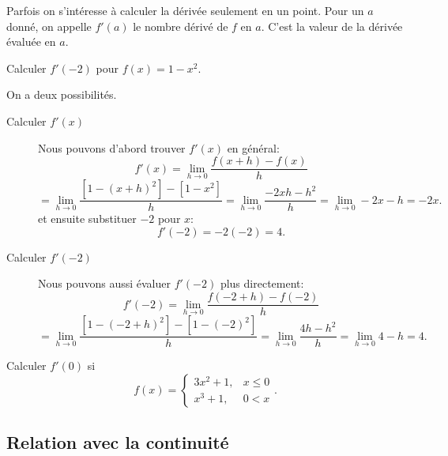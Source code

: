 \documentclass[a4paper,12pt]{article}
\begin{document}
Parfois on s'intéresse à calculer la dérivée seulement en un point. Pour un $a$ donné, on appelle $f'(a)$ le nombre dérivé de $f$ en $a$. C'est la valeur de la dérivée évaluée en $a$. 
\begin{exemple}
\tcblower 
Calculer $f'(-2)$ pour $f(x)=1-x^2$. 

On a deux possibilités. 
\begin{description}
	\item[Calculer $f'(x)$]
 Nous pouvons d'abord trouver $f'(x)$ en général:
$$f'(x) = \displaystyle\lim_{h \to 0} \dfrac{f(x+h) - f(x)}{h}$$
$$= \displaystyle\lim_{h \to 0} \dfrac{[1 - (x+h)^2] - [1 - x^2]}{h} = \displaystyle\lim_{h \to 0} \dfrac{-2xh - h^2}{h} = \displaystyle\lim_{h \to 0} -2x - h = -2x.$$
et ensuite substituer $-2$ pour $x$:
$$f'(-2) = -2(-2) = 4.$$

	\item[Calculer $f'(-2)$] 
Nous pouvons aussi évaluer $f'(-2)$ plus directement:
$$f'(-2) = \displaystyle\lim_{h \to 0} \dfrac{f(-2+h) - f(-2)}{h}$$
$$= \displaystyle\lim_{h \to 0} \dfrac{[1 - (-2+h)^2] - [1 - (-2)^2]}{h} = \displaystyle\lim_{h \to 0} \dfrac{4h - h^2}{h} = \displaystyle\lim_{h \to 0} 4 - h = 4.$$

\end{description}
\end{exemple}
\begin{exemple}
	\tcblower
Calculer $f'(0)$ si
$$f(x) = \begin{cases}
    3x^2 + 1, & x \le 0 \\
    x^3 + 1, & 0 < x \end{cases}.$$
    \vspace{10cm}
\end{exemple}

\subsection{Relation avec la continuité}
\end{document}
